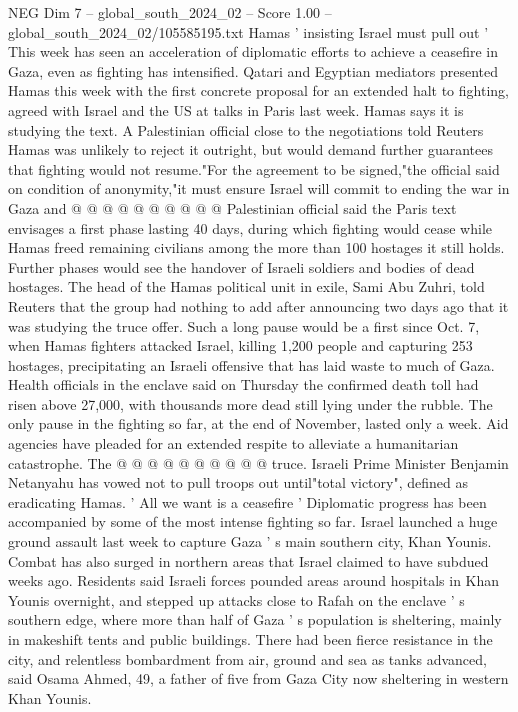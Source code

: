 \begin{textsample}{NEG Dim 7 – global\_south\_2024\_02 – Score 1.00 – global\_south\_2024\_02/105585195.txt}
Hamas ' insisting Israel must pull out ' This week has seen an acceleration of diplomatic efforts to achieve a ceasefire in Gaza, even as fighting has intensified.
Qatari and Egyptian mediators presented Hamas this week with the first concrete proposal for an extended halt to fighting, agreed with Israel and the US at talks in Paris last week.
Hamas says it is studying the text.
A Palestinian official close to the negotiations told Reuters Hamas was unlikely to reject it outright, but would demand further guarantees that fighting would not resume."For the agreement to be signed,"the official said on condition of anonymity,"it must ensure Israel will commit to ending the war in Gaza and @ @ @ @ @ @ @ @ @ @ Palestinian official said the Paris text envisages a first phase lasting 40 days, during which fighting would cease while Hamas freed remaining civilians among the more than 100 hostages it still holds.
Further phases would see the handover of Israeli soldiers and bodies of dead hostages.
The head of the Hamas political unit in exile, Sami Abu Zuhri, told Reuters that the group had nothing to add after announcing two days ago that it was studying the truce offer.
Such a long pause would be a first since Oct. 7, when Hamas fighters attacked Israel, killing 1,200 people and capturing 253 hostages, precipitating an Israeli offensive that has laid waste to much of Gaza.
Health officials in the enclave said on Thursday the confirmed death toll had risen above 27,000, with thousands more dead still lying under the rubble.
The only pause in the fighting so far, at the end of November, lasted only a week.
Aid agencies have pleaded for an extended respite to alleviate a humanitarian catastrophe.
The @ @ @ @ @ @ @ @ @ @ truce.
Israeli Prime Minister Benjamin Netanyahu has vowed not to pull troops out until"total victory", defined as eradicating Hamas. ' All we want is a ceasefire ' Diplomatic progress has been accompanied by some of the most intense fighting so far.
Israel launched a huge ground assault last week to capture Gaza ' s main southern city, Khan Younis.
Combat has also surged in northern areas that Israel claimed to have subdued weeks ago.
Residents said Israeli forces pounded areas around hospitals in Khan Younis overnight, and stepped up attacks close to Rafah on the enclave ' s southern edge, where more than half of Gaza ' s population is sheltering, mainly in makeshift tents and public buildings.
There had been fierce resistance in the city, and relentless bombardment from air, ground and sea as tanks advanced, said Osama Ahmed, 49, a father of five from Gaza City now sheltering in western Khan Younis.

\end{textsample}

